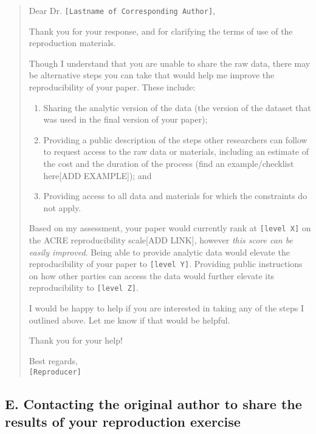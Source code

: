 \documentclass[]{book}
\providecommand{\tightlist}{%
  \setlength{\itemsep}{0pt}\setlength{\parskip}{0pt}}
\begin{document}
\begin{quote}
Dear Dr. \texttt{{[}Lastname\ of\ Corresponding\ Author{]}},

Thank you for your response, and for clarifying the terms of use of the reproduction materials.

Though I understand that you are unable to share the raw data, there may be alternative steps you can take that would help me improve the reproducibility of your paper. These include:

\begin{enumerate}
\def\labelenumi{\arabic{enumi}.}
\tightlist
\item
  Sharing the analytic version of the data (the version of the dataset that was used in the final version of your paper);\\
\item
  Providing a public description of the steps other researchers can follow to request access to the raw data or materials, including an estimate of the cost and the duration of the process (find an example/checklist here{[}ADD EXAMPLE{]}); and\\
\item
  Providing access to all data and materials for which the constraints do not apply.
\end{enumerate}

Based on my assessment, your paper would currently rank at \texttt{{[}level\ X{]}} on the ACRE reproducibility scale{[}ADD LINK{]}, however \emph{this score can be easily improved}. Being able to provide analytic data would elevate the reproducibility of your paper to \texttt{{[}level\ Y{]}}. Providing public instructions on how other parties can access the data would further elevate its reproducibility to \texttt{{[}level\ Z{]}}.

I would be happy to help if you are interested in taking any of the steps I outlined above. Let me know if that would be helpful.

Thank you for your help!

Best regards,\\
\texttt{{[}Reproducer{]}}
\end{quote}

\hypertarget{e.-contacting-the-original-author-to-share-the-results-of-your-reproduction-exercise}{%
\subsection{E. Contacting the original author to share the results of your reproduction exercise}\label{e.-contacting-the-original-author-to-share-the-results-of-your-reproduction-exercise}}
\end{document}
